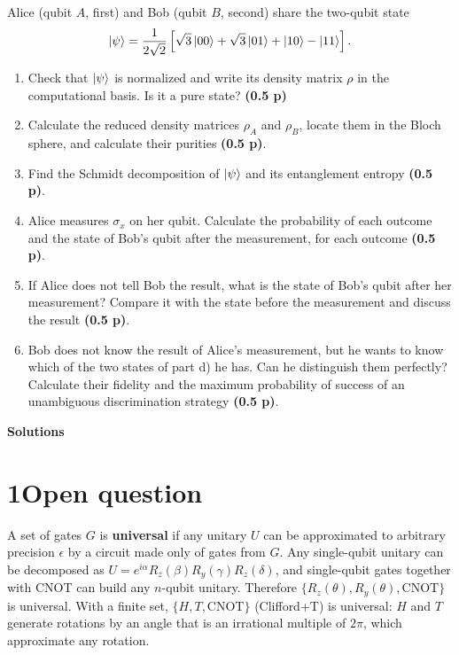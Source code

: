 \documentclass[11pt,a4paper]{article}
\newcommand{\pts}[1]{\textbf{(#1)}}
\newcommand{\sol}{\color{blue!60!black}}
\begin{document}
Alice (qubit $A$, first) and Bob (qubit $B$, second) share the two-qubit state
\[
\ket\psi=\frac{1}{2\sqrt2}\left[\sqrt3\ket{00}+\sqrt3\ket{01}+\ket{10}-\ket{11}\right].
\]
\begin{enumerate}
\item Check that $\ket\psi$ is normalized and write its density matrix $\rho$ in the computational
basis. Is it a pure state? \pts{0.5 p}
\item Calculate the reduced density matrices $\rho_A$ and $\rho_B$, locate them in the Bloch sphere,
and calculate their purities \pts{0.5 p}.
\item Find the Schmidt decomposition of $\ket\psi$ and its entanglement entropy \pts{0.5 p}.
\item Alice measures $\sigma_x$ on her qubit. Calculate the probability of each outcome and the
state of Bob's qubit after the measurement, for each outcome \pts{0.5 p}.
\item If Alice does not tell Bob the result, what is the state of Bob's qubit after her measurement?
Compare it with the state before the measurement and discuss the result \pts{0.5 p}.
\item Bob does not know the result of Alice's measurement, but he wants to know which of the two
states of part d) he has. Can he distinguish them perfectly? Calculate their fidelity and the
maximum probability of success of an unambiguous discrimination strategy \pts{0.5 p}.
\end{enumerate}

\newpage
\begin{center}
\Large\textbf{Solutions}
\end{center}
\sol

\section*{1\quad Open question}

A set of gates $G$ is \textbf{universal} if any unitary $U$ can be approximated to arbitrary
precision $\epsilon$ by a circuit made only of gates from $G$. Any single-qubit unitary can be
decomposed as $U=e^{i\alpha}R_z(\beta)R_y(\gamma)R_z(\delta)$, and single-qubit gates together with
CNOT can build any $n$-qubit unitary. Therefore $\{R_z(\theta),R_y(\theta),\text{CNOT}\}$ is
universal. With a finite set, $\{H,T,\text{CNOT}\}$ (Clifford+T) is universal: $H$ and $T$ generate
rotations by an angle that is an irrational multiple of $2\pi$, which approximate any rotation.
\end{document}
